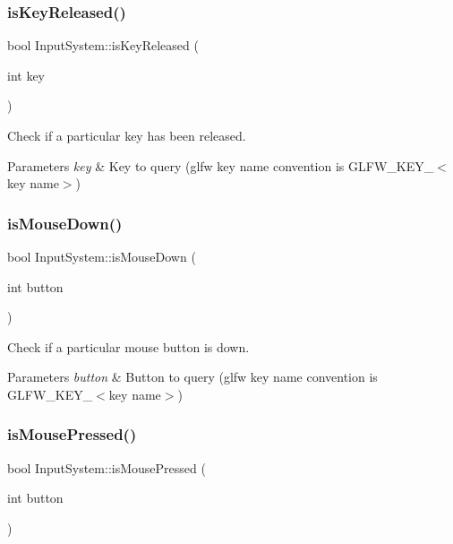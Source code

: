 \subsubsection{\texorpdfstring{isKeyReleased()}{isKeyReleased()}}
{\footnotesize\ttfamily bool Input\+System\+::is\+Key\+Released (\begin{DoxyParamCaption}\item[{int}]{key }\end{DoxyParamCaption})}



Check if a particular key has been released. 


\begin{DoxyParams}{Parameters}
{\em key} & Key to query (glfw key name convention is G\+L\+F\+W\+\_\+\+K\+E\+Y\+\_\+$<$key name$>$) \\
\hline
\end{DoxyParams}
\mbox{\label{class_input_system_ae7d3e90aaf6ba8a070f660f25997a2bb}} 
\subsubsection{\texorpdfstring{isMouseDown()}{isMouseDown()}}
{\footnotesize\ttfamily bool Input\+System\+::is\+Mouse\+Down (\begin{DoxyParamCaption}\item[{int}]{button }\end{DoxyParamCaption})}



Check if a particular mouse button is down. 


\begin{DoxyParams}{Parameters}
{\em button} & Button to query (glfw key name convention is G\+L\+F\+W\+\_\+\+K\+E\+Y\+\_\+$<$key name$>$) \\
\hline
\end{DoxyParams}
\mbox{\label{class_input_system_a0d8c4979a46e2858d3f351cfcf755757}} 
\subsubsection{\texorpdfstring{isMousePressed()}{isMousePressed()}}
{\footnotesize\ttfamily bool Input\+System\+::is\+Mouse\+Pressed (\begin{DoxyParamCaption}\item[{int}]{button }\end{DoxyParamCaption})}



